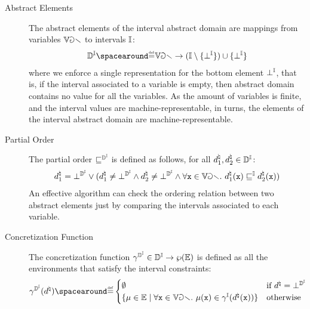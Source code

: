   \begin{description}
    \item[Abstract Elements] The abstract elements of the interval abstract domain are mappings from variables $\mathbb{Var}$ to intervals $\mathbb{I}$:
    \begin{align*}
      \intervalabstractdomaintype \DefeQ \variables \to (\intervaltype \setminus \{\intervalbottom\}) \setjoin \{\intervalbottom\}
    \end{align*}
    where we enforce a single representation for the bottom element $\bot^{\mathbb{I}}$, that is, if the interval associated to a variable is empty, then abstract domain contains no value for all the variables.
    As the amount of variables is finite, and the interval values are machine-representable, in turns, the elements of the interval abstract domain are machine-representable.
    \item[Partial Order] The partial order $\sqsubseteq^{\mathbb{D}^{\mathbb{I}}}$ is defined as follows, for all $d^\natural_1, d^\natural_2 \in \mathbb{D}^{\mathbb{I}}$:
    \begin{align*}
      d^\natural_1 = \bot^{\mathbb{D}^{\mathbb{I}}} \lor (d^\natural_1 \neq \bot^{\mathbb{D}^{\mathbb{I}}} \land d^\natural_2 \neq \bot^{\mathbb{D}^{\mathbb{I}}} \land \forall \textup{\texttt{x}} \in \mathbb{Var}.~ d^\natural_1(\textup{\texttt{x}}) \sqsubseteq^{\mathbb{I}} d^\natural_2(\textup{\texttt{x}}))
    \end{align*}
    An effective algorithm can check the ordering relation between two abstract elements just by comparing the intervals associated to each variable.
    \item[Concretization Function] The concretization function $\gamma^{\mathbb{D}^{\mathbb{I}}}\in\mathbb{D}^{\mathbb{I}}\to\wp(\mathbb{E})$ is defined as all the environments that satisfy the interval constraints:
    \begin{align*}
      \intervalabstractdomainconcretization(\defabstractvalue) \DefeQ \begin{cases}
        \emptyset & \text{if } \defabstractvalue = \intervalabstractdomainbottom \\
        \setdef{\defenv\in\env}{\forall \defvariable \in \variables.\spacer \defenv(\defvariable) \in \intervalconcretization(\defabstractvalue(\defvariable))} & \text{otherwise}
      \end{cases}
    \end{align*}

\end{description}
